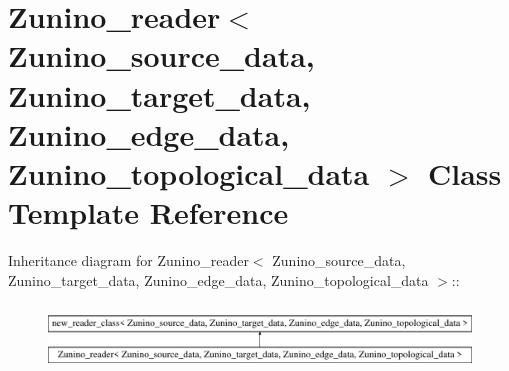 \hypertarget{classZunino__reader}{
\section{Zunino\_\-reader$<$ Zunino\_\-source\_\-data, Zunino\_\-target\_\-data, Zunino\_\-edge\_\-data, Zunino\_\-topological\_\-data $>$ Class Template Reference}
\label{classZunino__reader}
}
Inheritance diagram for Zunino\_\-reader$<$ Zunino\_\-source\_\-data, Zunino\_\-target\_\-data, Zunino\_\-edge\_\-data, Zunino\_\-topological\_\-data $>$::\begin{figure}[H]
\begin{center}
\leavevmode
\includegraphics[height=1.73107cm]{classZunino__reader}
\end{center}
\end{figure}

